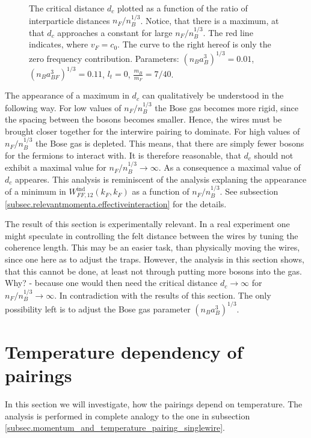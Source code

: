 \begin{figure} 
\begin{center}  
  
\caption{The critical distance $d_c$ plotted as a function of the ratio of interparticle distances $n_F/n_B^{1/3}$. Notice, that there is a maximum, at that $d_c$ approaches a constant for large $n_F/n_B^{1/3}$. The red line indicates, where $v_F = c_0$. The curve to the right hereof is only the zero frequency contribution. Parameters: $(n_Ba_B^3)^{1/3} = 0.01$, $(n_Ba_{BF}^3)^{1/3} = 0.11$, $l_t = 0$, $\frac{m_B}{m_F} = 7/40$. }  
\label{fig.twowirescrossovernBdepend}  
\end{center}    
\end{figure}

The appearance of a maximum in $d_c$ can qualitatively be understood in the following way. For low values of $n_F/n_B^{1/3}$ the Bose gas becomes more rigid, since the spacing between the bosons becomes smaller. Hence, the wires must be brought closer together for the interwire pairing to dominate. For high values of $n_F/n_B^{1/3}$ the Bose gas is depleted. This means, that there are simply fewer bosons for the fermions to interact with. It is therefore reasonable, that $d_c$ should not exhibit a maximal value for $n_F/n_B^{1/3} \to \infty$. As a consequence a maximal value of $d_c$ appeares. This analysis is reminiscent of the analysis explaning the appearance of a minimum in $W^\text{ind}_{FF,12}(k_F,k_F)$ as a function of $n_F/n_B^{1/3}$. See subsection \ref{subsec.relevantmomenta.effectiveinteraction} for the details.  

The result of this section is experimentally relevant. In a real experiment one might speculate in controlling the felt distance between the wires by tuning the coherence length. This may be an easier task, than physically moving the wires, since one here as to adjust the traps. However, the analysis in this section shows, that this cannot be done, at least not through putting more bosons into the gas. Why? - because one would then need the critical distance $d_c \to \infty$ for $n_F/n_B^{1/3} \to \infty$. In contradiction with the results of this section. The only possibility left is to adjust the Bose gas parameter $(n_Ba_B^3)^{1/3}$. 

\section{Temperature dependency of pairings}
In this section we will investigate, how the pairings depend on temperature. The analysis is performed in complete analogy to the one in subsection \ref{subsec.momentum_and_temperature_pairing_singlewire}. 


